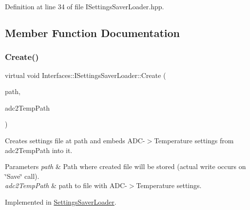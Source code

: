 Definition at line 34 of file I\+Settings\+Saver\+Loader.\+hpp.



\subsection{Member Function Documentation}
\mbox{\label{class_interfaces_1_1_i_settings_saver_loader_a67e729cc53f53b6bdeb534dc62000531}} 
\subsubsection{\texorpdfstring{Create()}{Create()}}
{\footnotesize\ttfamily virtual void Interfaces\+::\+I\+Settings\+Saver\+Loader\+::\+Create (\begin{DoxyParamCaption}\item[{Q\+String}]{path,  }\item[{Q\+String}]{adc2\+Temp\+Path }\end{DoxyParamCaption})\hspace{0.3cm}{\ttfamily [pure virtual]}}



Creates settings file at path and embeds A\+D\+C-\/$>$Temperature settings from adc2\+Temp\+Path into it. 


\begin{DoxyParams}{Parameters}
{\em path} & Path where created file will be stored (actual write occurs on \char`\"{}\+Save\char`\"{} call). \\
\hline
{\em adc2\+Temp\+Path} & path to file with A\+D\+C-\/$>$Temperature settings. \\
\hline
\end{DoxyParams}


Implemented in \hyperlink{class_settings_saver_loader_a23524241e3edea7f26b72807c0090bdc}{Settings\+Saver\+Loader}.

\mbox{\label{class_interfaces_1_1_i_settings_saver_loader_a4f855492363276d81031d931a72a49a3}} 
